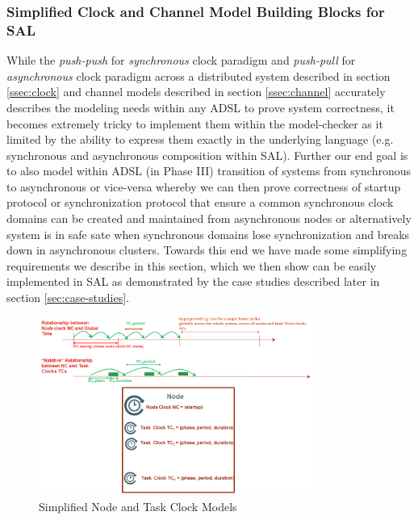 \subsubsection{Simplified Clock and Channel Model Building Blocks for SAL}
\label{ssec:simple_clock_channel}



While the \emph{push-push} for \emph{synchronous} clock paradigm and \emph{push-pull} for \emph{asynchronous} clock paradigm across a distributed system  described in section \ref{ssec:clock} and channel models described in section \ref{ssec:channel} accurately describes the modeling needs within any ADSL to prove system correctness, it becomes  extremely tricky to implement them within the model-checker as it limited by the ability to express them exactly in the underlying language (e.g. synchronous and asynchronous composition within SAL). Further our end goal is to also model within ADSL (in Phase III) transition of systems from synchronous to asynchronous or vice-versa whereby we can then prove correctness of startup protocol or  synchronization protocol that ensure a common synchronous clock domains can be created and maintained from asynchronous nodes or alternatively system is in safe sate when synchronous domains lose synchronization and breaks down in asynchronous clusters. Towards this end we have made some simplifying requirements we describe in this section, which we then show can be easily implemented in SAL as demonstrated by the case studies described later in section \ref{sec:case-studies}.

\begin{figure}
\begin{center}
\includegraphics[width=0.8\textwidth]{figures/clocks_overall_node}
\caption{Simplified Node and Task Clock Models}
\label{fig:clocks_overall_node}
\end{center}
\end{figure}

